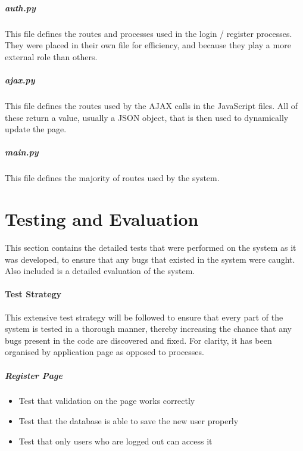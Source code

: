 \documentclass{article}[12pt,a4paper]
\begin{document}
\subsubsection{auth.py}
This file defines the routes and processes used in the login / register processes. They were placed in their own file for efficiency, and because they play a more external role than others.


\subsubsection{ajax.py}
This file defines the routes used by the AJAX calls in the JavaScript files. All of these return a value, usually a JSON object, that is then used to dynamically update the page.


\subsubsection{main.py}
This file defines the majority of routes used by the system.


\cleardoublepage

\part{Testing and Evaluation}
This section contains the detailed tests that were performed on the system as it was developed, to ensure that any bugs that existed in the system were caught. Also included is a detailed evaluation of the system.

\subsection{Test Strategy}
This extensive test strategy will be followed to ensure that every part of the system is tested in a thorough manner, thereby increasing the chance that any bugs present in the code are discovered and fixed. For clarity, it has been organised by application page as opposed to processes.

\subsubsection{Register Page}
\begin{itemize}
  \item Test that validation on the page works correctly
  \item Test that the database is able to save the new user properly
  \item Test that only users who are logged out can access it
\end{itemize}
\end{document}
